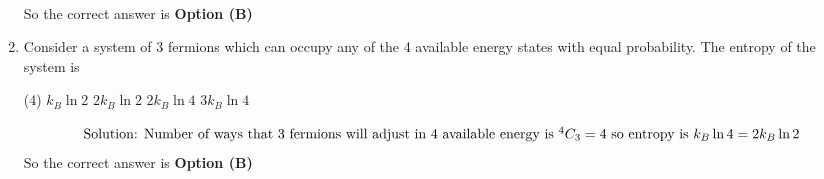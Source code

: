 \begin{enumerate}
\begin{answer}
\begin{align*}
\end{align*}
So the correct answer is \textbf{Option (B)}
\end{answer}
	\item Consider a system of 3 fermions which can occupy any of the 4 available energy states with equal probability. The entropy of the system is
{	}
\begin{tasks}(4)
\task[\textbf{A.}] $k_{B} \ln 2$
\task[\textbf{B.}] $2 k_{B} \ln 2$
\task[\textbf{C.}]  $2 k_{B} \ln 4$
\task[\textbf{D.}]  $3 k_{B} \ln 4$
\end{tasks}
\begin{answer}
\begin{align*}
\intertext{Solution: Number of ways that 3 fermions will adjust in 4 available energy is ${ }^{4} C_{3}=4$ so entropy is $k_{B} \ln 4=2 k_{B} \ln 2$}
\end{align*}
So the correct answer is \textbf{Option (B)}
\end{answer}
	
	
	
	
	
	
	
\end{enumerate}